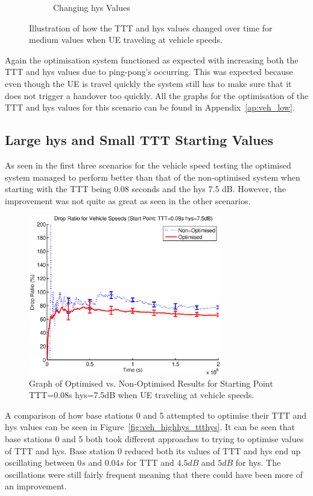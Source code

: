 \begin{figure}[H]
\begin{subfigure}[b]{0.49\textwidth}
                \caption{Changing hys Values}
                \label{fig:veh_low_hys}
        \end{subfigure}
        \caption{Illustration of how the TTT and hys values changed over time for medium values when UE traveling at vehicle speeds.}\label{fig:veh_low_ttthys}
\end{figure}
Again the optimisation system functioned as expected with increasing both the TTT and hys values due to ping-pong's occurring. This was expected because even though the UE is travel quickly the system still has to make sure that it does not trigger a handover too quickly. All the graphs for the optimisation of the TTT and hys values for this scenario can be found in Appendix~\ref{ap:veh_low}.
\subsection{Large hys and Small TTT Starting Values}
As seen in the first three scenarios for the vehicle speed testing the optimised system managed to perform better than that of the non-optimised system when starting with the TTT being 0.08 seconds and the hys 7.5 dB. However, the improvement was not quite as great as seen in the other scenarios. 
\begin{figure}[H]
  \begin{center}
    	  \includegraphics[width=0.75\textwidth]{figures/vehicle_figures/vehhighhys.eps}
    \end{center}
    \caption{Graph of Optimised vs. Non-Optimised Results for Starting Point TTT=0.08s hys=7.5dB when UE traveling at vehicle speeds.}
    \label{fig:veh_highhys_drop}
\end{figure}
A comparison of how base stations 0 and 5 attempted to optimise their TTT and hys values can be seen in Figure~\ref{fig:veh_highhys_ttthys}. It can be seen that base stations 0 and 5 both took different approaches to trying to optimise values of TTT and hys. Base station 0 reduced both its values of TTT and hys end up oscillating between $0 s$ and $0.04 s$ for TTT and $4.5 dB$ and $5 dB$ for hys. The oscillations were still fairly frequent meaning that there could have been more of an improvement.

